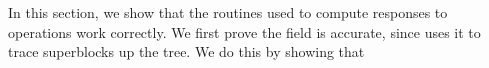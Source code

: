 In this section, we show that the routines used to compute responses to 
operations work correctly.
We first prove the  field is accurate, since  uses it to trace superblocks up the tree.  We do this by showing that 

